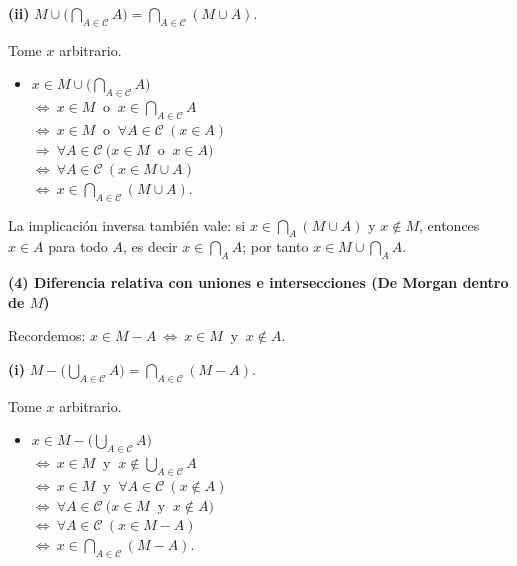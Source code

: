 \documentclass[12pt,letterpaper]{exam}
\begin{document}
\begin{questions}
\textbf{(ii)} \quad $
M \cup \Big( \displaystyle\bigcap_{A\in\mathcal C} A \Big)
= \displaystyle\bigcap_{A\in\mathcal C} (M \cup A).
$
\medskip

Tome $x$ arbitrario.
\begin{itemize}
  \item $x \in M \cup \Big(\displaystyle\bigcap_{A\in\mathcal C} A\Big)$\\[2pt]
  $\Leftrightarrow\ x \in M \ \text{ o }\ x \in \displaystyle\bigcap_{A\in\mathcal C} A$\\[2pt]
  $\Leftrightarrow\ x \in M \ \text{ o }\ \forall A \in \mathcal C \ (x \in A)$\\[2pt]
  $\Rightarrow\ \forall A \in \mathcal C \ \big(x \in M \ \text{ o }\ x \in A\big)$\\[2pt]
  $\Leftrightarrow\ \forall A \in \mathcal C \ (x \in M \cup A)$\\[2pt]
  $\Leftrightarrow\ x \in \displaystyle\bigcap_{A\in\mathcal C} (M \cup A)$.
\end{itemize}
La implicación inversa también vale: si $x\in\bigcap_{A}(M\cup A)$ y $x\notin M$, entonces $x\in A$ para todo $A$, es decir $x\in\bigcap_A A$; por tanto $x\in M\cup\bigcap_A A$.
\bigskip

\question \textbf{(4) Diferencia relativa con uniones e intersecciones (De Morgan dentro de $M$)}

Recordemos: \;
$x \in M - A \ \Leftrightarrow\ x \in M \ \text{ y }\ x \notin A$.
\medskip

\textbf{(i)} \quad $
M - \Big( \displaystyle\bigcup_{A\in\mathcal C} A \Big)
= \displaystyle\bigcap_{A\in\mathcal C} (M - A).
$
\medskip

Tome $x$ arbitrario.
\begin{itemize}
  \item $x \in M - \Big(\displaystyle\bigcup_{A\in\mathcal C} A\Big)$\\[2pt]
  $\Leftrightarrow\ x \in M \ \text{ y }\ x \notin \displaystyle\bigcup_{A\in\mathcal C} A$\\[2pt]
  $\Leftrightarrow\ x \in M \ \text{ y }\ \forall A \in \mathcal C \ (x \notin A)$\\[2pt]
  $\Leftrightarrow\ \forall A \in \mathcal C \ \big(x \in M \ \text{ y }\ x \notin A\big)$\\[2pt]
  $\Leftrightarrow\ \forall A \in \mathcal C \ (x \in M - A)$\\[2pt]
  $\Leftrightarrow\ x \in \displaystyle\bigcap_{A\in\mathcal C} (M - A)$.
\end{itemize}
\medskip


\end{questions}
\end{document}
